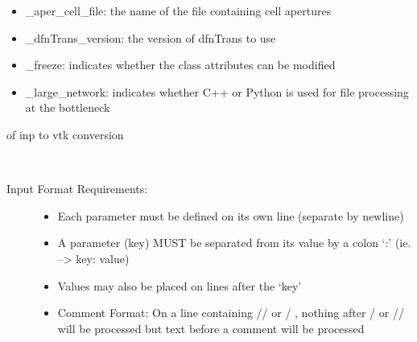 \documentclass[letterpaper,10pt,english]{sphinxmanual}
\begin{document}
\begin{fulllineitems}
\begin{description}
\begin{itemize}
\item {} 
\_aper\_cell\_file: the name of the file containing cell apertures

\item {} 
\_dfnTrans\_version: the version of dfnTrans to use

\item {} 
\_freeze: indicates whether the class attributes can be modified

\item {} 
\_large\_network: indicates whether C++ or Python is used for file processing at the bottleneck

\end{itemize}

of inp to vtk conversion

\end{description}

\begin{fulllineitems}
\label{pydfnworks:pydfnworks.DFNWORKS.argparse}
\end{fulllineitems}


\begin{fulllineitems}
\label{pydfnworks:pydfnworks.DFNWORKS.check_input}~\begin{description}
\item[{Input Format Requirements:  }] \leavevmode\begin{itemize}
\item {} 
Each parameter must be defined on its own line (separate by newline)

\item {} 
A parameter (key) MUST be separated from its value by a colon `:' (ie. --\textgreater{} key: value)

\item {} 
Values may also be placed on lines after the `key'

\item {} 
Comment Format:  On a line containing  // or / \code{*}, nothing after \code{*} / or // will be processed  but text before a comment will be processed


\end{itemize}
\end{description}
\end{fulllineitems}
\end{fulllineitems}
\end{document}
